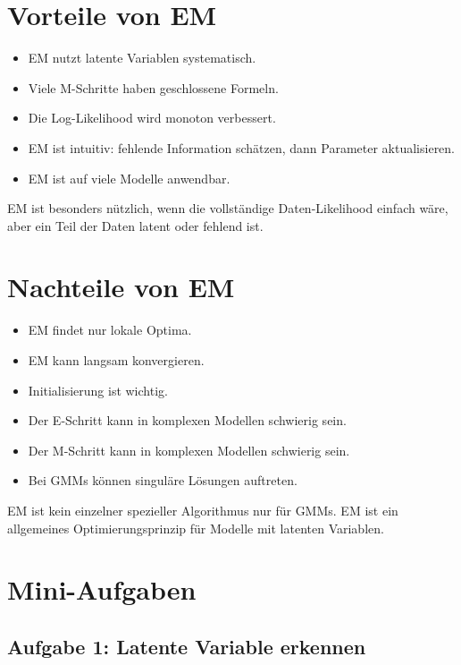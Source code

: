 \section{Vorteile von EM}

\begin{itemize}
    \item EM nutzt latente Variablen systematisch.
    \item Viele M-Schritte haben geschlossene Formeln.
    \item Die Log-Likelihood wird monoton verbessert.
    \item EM ist intuitiv: fehlende Information schätzen, dann Parameter aktualisieren.
    \item EM ist auf viele Modelle anwendbar.
\end{itemize}

\begin{conceptbox}
EM ist besonders nützlich, wenn die vollständige Daten-Likelihood einfach wäre, aber ein Teil der Daten latent oder fehlend ist.
\end{conceptbox}

\section{Nachteile von EM}

\begin{itemize}
    \item EM findet nur lokale Optima.
    \item EM kann langsam konvergieren.
    \item Initialisierung ist wichtig.
    \item Der E-Schritt kann in komplexen Modellen schwierig sein.
    \item Der M-Schritt kann in komplexen Modellen schwierig sein.
    \item Bei GMMs können singuläre Lösungen auftreten.
\end{itemize}

\begin{notebox}
EM ist kein einzelner spezieller Algorithmus nur für GMMs.
EM ist ein allgemeines Optimierungsprinzip für Modelle mit latenten Variablen.
\end{notebox}

\section{Mini-Aufgaben}

\subsection{Aufgabe 1: Latente Variable erkennen}

